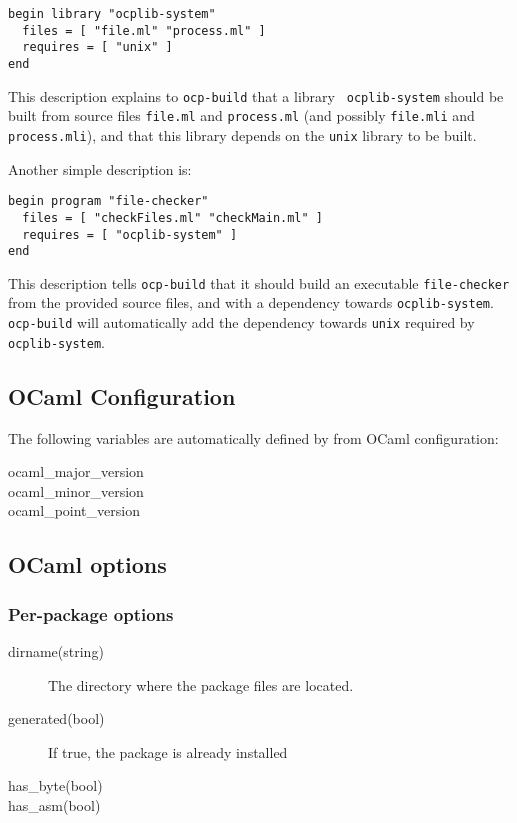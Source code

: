 \begin{verbatim}
begin library "ocplib-system"
  files = [ "file.ml" "process.ml" ]
  requires = [ "unix" ]
end
\end{verbatim}

This description explains to {\tt ocp-build} that a library {\tt
  ocplib-system} should be built from source files {\tt file.ml} and
{\tt process.ml} (and possibly {\tt file.mli} and {\tt process.mli}),
and that this library depends on the {\tt unix} library to be built.

Another simple description is:

\begin{verbatim}
begin program "file-checker"
  files = [ "checkFiles.ml" "checkMain.ml" ]
  requires = [ "ocplib-system" ]
end
\end{verbatim}

This description tells {\tt ocp-build} that it should build an
executable {\tt file-checker} from the provided source files, and with
a dependency towards {\tt ocplib-system}. {\tt ocp-build} will
automatically add the dependency towards {\tt unix} required by {\tt
  ocplib-system}.

\subsection{OCaml Configuration}

The following variables are automatically defined by
\ocpbuild{} from OCaml configuration:
\begin{description}
\item[ocaml\_major\_version]
\item[ocaml\_minor\_version]
\item[ocaml\_point\_version]
\end{description}

\subsection{OCaml options}

\subsubsection{Per-package options}

\begin{description}
\item[dirname(string)] The directory where the package files are located.
\item[generated(bool)] If true, the package is already installed
\item[has\_byte(bool)]
\item[has\_asm(bool)]
\end{description}

